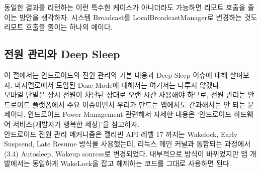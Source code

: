동일한 결과를 리턴하는 이런 특수한 케이스가 아니더라도 가능하면 리모트 호출을 줄이는 방안을 생각하자. 
시스템 Broadcast를 LocalBroadcastManager로 변경하는 것도 리모트 호출을 줄이는 하나의 예이다. 

\subsection{전원 관리와 Deep Sleep}
이 절에서는 안드로이드의 전원 관리의 기본 내용과 Deep Sleep 이슈에 대해 살펴보자. 마시멜로에서 도입된 Doze Mode에 대해서는 여기서는 다루지 않겠다.\\

모바일 단말은 상시 전원이 차단된 상태로 오랜 시간 사용해야 하므로, 전원 관리는 안드로이드 플랫폼에서 주요 이슈이면서 우리가 만드는 앱에서도 간과해서는 안 되는 문제이다.
안드로이드 Power Management 관련해서 자세한 내용은 `안드로이드 하드웨어 서비스(개발자가 행복한 세상)'을 참고하자.\\

안드로이드 전원 관리 메커니즘은 젤리빈 API 레벨 17 까지는 Wakelock, Early Suspsend, Late Resume 방식을 사용했는데, 리눅스 메인 커널과 통합되는 과정에서(3.4) Autosleep, Wakeup sources로 변경되었다. 내부적으로 방식이 바뀌었지만 앱 개발에서는 동일하게 WakeLock을 잡고 해제하는 코드를 그대로 사용하면 된다.\\

